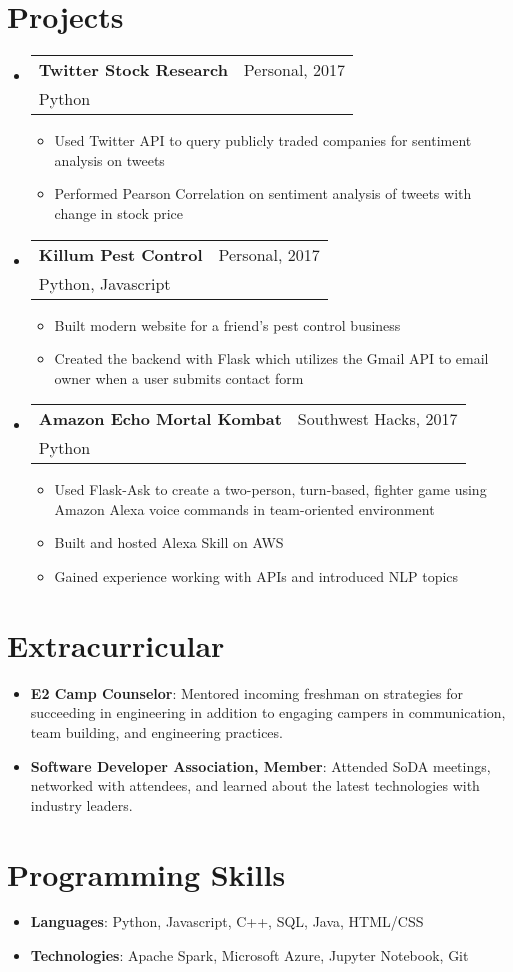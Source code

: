 \documentclass[letterpaper,11pt]{article}
\makeatletter
\newcommand{\resumeItem}[1]{
  \item\small{
    {#1 \vspace{-2pt}}
  }
}
\newcommand{\resumeProject}[3]{
  \vspace{-1pt}\item
    \begin{tabular*}{0.97\textwidth}{l@{\extracolsep{\fill}}r}
      \textbf{#1} & #2 \\
      \small{#3} \\
    \end{tabular*}\vspace{-5pt}
}
\newcommand{\resumeSubItem}[2]{ 
    \item\small{
        \textbf{#1}{: #2 \vspace{-2pt}}
  }}
\newcommand{\resumeSubHeadingListStart}{\begin{itemize}[leftmargin=*]}
\newcommand{\resumeSubHeadingListEnd}{\end{itemize}}
\newcommand{\resumeItemListStart}{\begin{itemize}}
\newcommand{\resumeItemListEnd}{\end{itemize}\vspace{-5pt}}
\makeatother
\begin{document}
\section{Projects}
  \resumeSubHeadingListStart
    \resumeProject{Twitter Stock Research}{Personal, 2017}{Python}
        \resumeItemListStart
            \resumeItem{Used Twitter API to query publicly traded companies for sentiment analysis on tweets}
            \resumeItem{Performed Pearson Correlation on sentiment analysis of tweets with change in stock price}
        \resumeItemListEnd
    \resumeProject{Killum Pest Control}{Personal, 2017}{Python, Javascript}
        \resumeItemListStart
            \resumeItem{Built modern website for a friend’s pest control business}
            \resumeItem{Created the backend with Flask which utilizes the Gmail API to email owner when a user submits contact form}
        \resumeItemListEnd
    \resumeProject{Amazon Echo Mortal Kombat}{Southwest Hacks, 2017}{Python}
        \resumeItemListStart
            \resumeItem{Used Flask-Ask to create a two-person, turn-based, fighter game using Amazon Alexa voice commands in team-oriented environment}
            \resumeItem{Built and hosted Alexa Skill on AWS}
            \resumeItem{Gained experience working with APIs and introduced NLP topics}
        \resumeItemListEnd
  \resumeSubHeadingListEnd
  
  
\section{Extracurricular}
    \resumeSubHeadingListStart
        \resumeSubItem{E2 Camp Counselor}
          {Mentored incoming freshman on strategies for succeeding in engineering in addition to engaging campers in communication, team building, and engineering practices.}
        \resumeSubItem{Software Developer Association, Member}
          {Attended SoDA meetings, networked with attendees, and learned about the latest technologies with industry leaders.}
  \resumeSubHeadingListEnd


\section{Programming Skills}
  \resumeSubHeadingListStart
    \item{
      \textbf{Languages}{: Python, Javascript, C++, SQL, Java, HTML/CSS}
    }
    \item{
      \textbf{Technologies}{: Apache Spark, Microsoft Azure, Jupyter Notebook, Git}
    }
  \resumeSubHeadingListEnd


\end{document}

